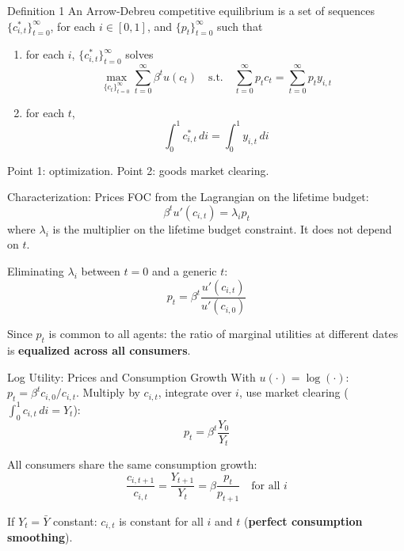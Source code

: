 \documentclass[blue]{beamer}
\begin{document}
\begin{frame}{Definition 1}
	An Arrow-Debreu competitive equilibrium is a set of sequences $\{c_{i,t}^*\}_{t=0}^{\infty}$, for each $i \in [0,1]$, and $\{p_t\}_{t=0}^{\infty}$ such that
	
	\medskip
	\begin{enumerate}
		\item for each $i$, $\{c_{i,t}^*\}_{t=0}^{\infty}$ solves
		\[
		\max_{\{c_t\}_{t=0}^{\infty}} \sum_{t=0}^{\infty} \beta^t u(c_t) \quad \text{s.t.} \quad \sum_{t=0}^{\infty} p_t c_t = \sum_{t=0}^{\infty} p_t y_{i,t}
		\]
		
		\item for each $t$,
		\[
		\int_0^1 c_{i,t}^* \, di = \int_0^1 y_{i,t} \, di
		\]
	\end{enumerate}
	
	\medskip
	Point 1: optimization. Point 2: goods market clearing.
\end{frame}

\begin{frame}{Characterization: Prices}
	FOC from the Lagrangian on the lifetime budget:
	\[
	\beta^t u'(c_{i,t}) = \lambda_i p_t
	\]
	where $\lambda_i$ is the multiplier on the lifetime budget constraint. It does not depend on $t$.
	
	\bigskip
	Eliminating $\lambda_i$ between $t = 0$ and a generic $t$:
	\[
	p_t = \beta^t \frac{u'(c_{i,t})}{u'(c_{i,0})}
	\]
	
	Since $p_t$ is common to all agents: the ratio of marginal utilities at different dates is \textbf{equalized across all consumers}.
\end{frame}

\begin{frame}{Log Utility: Prices and Consumption Growth}
	With $u(\cdot) = \log(\cdot)$: $p_t = \beta^t c_{i,0}/c_{i,t}$. Multiply by $c_{i,t}$, integrate over $i$, use market clearing ($\int_0^1 c_{i,t} \, di = Y_t$):
	\[
	p_t = \beta^t \frac{Y_0}{Y_t}
	\]
	
	All consumers share the same consumption growth:
	\[
	\frac{c_{i,t+1}}{c_{i,t}} = \frac{Y_{t+1}}{Y_t} = \beta \frac{p_t}{p_{t+1}} \quad \text{for all } i
	\]
	
	If $Y_t = \bar{Y}$ constant: $c_{i,t}$ is constant for all $i$ and $t$ (\textbf{perfect consumption smoothing}).
\end{frame}
\end{document}
